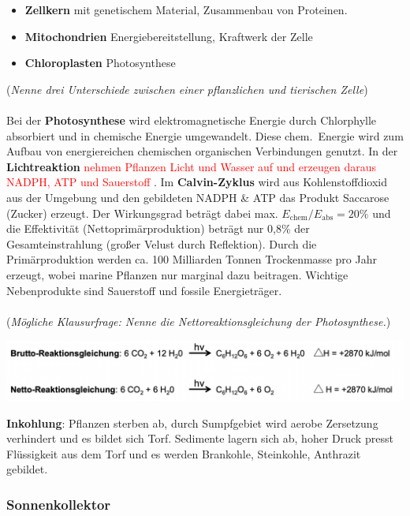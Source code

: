 \begin{itemize}
    \item \textbf{Zellkern} mit genetischem Material, Zusammenbau von Proteinen.
    \item \textbf{Mitochondrien} Energiebereitstellung, Kraftwerk der Zelle
    \item \textbf{Chloroplasten} Photosynthese \dangersign
\end{itemize}
(\dangersign \textit{Nenne drei Unterschiede zwischen einer pflanzlichen und tierischen Zelle})
\\\\
Bei der \textbf{Photosynthese} wird elektromagnetische Energie durch Chlorphylle absorbiert und in chemische Energie umgewandelt. Diese chem.\ Energie wird zum Aufbau von energiereichen chemischen organischen Verbindungen genutzt. In der \textbf{Lichtreaktion} \textcolor{red}{nehmen Pflanzen Licht und Wasser auf und erzeugen daraus NADPH, ATP und Sauerstoff} \dangersign. Im \textbf{Calvin-Zyklus} wird aus Kohlenstoffdioxid aus der Umgebung und den gebildeten NADPH \& ATP das Produkt Saccarose (Zucker) erzeugt. Der Wirkungsgrad beträgt dabei max. $E_{\text{chem}}/E_{\text{abs}}=20\%$ und die Effektivität (Nettoprimärproduktion) beträgt nur 0,8\% der Gesamteinstrahlung (großer Velust durch Reflektion). Durch die Primärproduktion werden ca. 100 Milliarden Tonnen Trockenmasse pro Jahr erzeugt, wobei marine Pflanzen nur marginal dazu beitragen. Wichtige Nebenprodukte sind Sauerstoff und fossile Energieträger.
\\\\
(\textit{Mögliche Klausurfrage: Nenne die Nettoreaktionsgleichung der Photosynthese.})

\begin{center}
    \includegraphics[width=14cm]{lec7/figures/gleichung.png}
\end{center}
\textbf{Inkohlung}: Pflanzen sterben ab, durch Sumpfgebiet wird aerobe Zersetzung verhindert und es bildet sich Torf. Sedimente lagern sich ab, hoher Druck presst Flüssigkeit aus dem Torf und es werden Brankohle, Steinkohle, Anthrazit gebildet.

\subsubsection{Sonnenkollektor}

